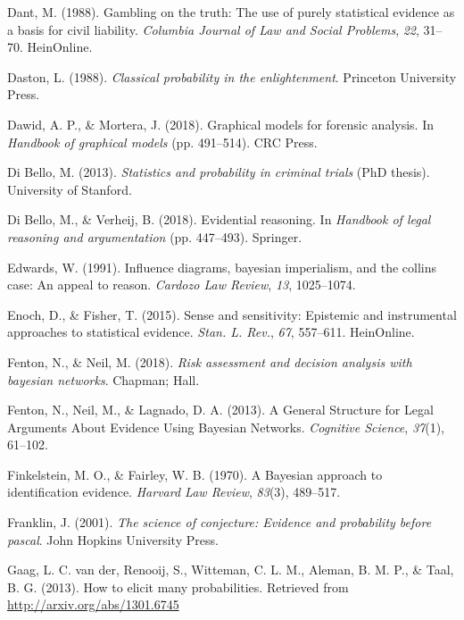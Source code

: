\documentclass[11pt,dvipsnames,enabledeprecatedfontcommands]{scrartcl}
\begin{document}
\leavevmode\hypertarget{ref-dant1988gambling}{}%
Dant, M. (1988). Gambling on the truth: The use of purely statistical
evidence as a basis for civil liability. \emph{Columbia Journal of Law
and Social Problems}, \emph{22}, 31--70. HeinOnline.

\leavevmode\hypertarget{ref-daston1988}{}%
Daston, L. (1988). \emph{Classical probability in the enlightenment}.
Princeton University Press.

\leavevmode\hypertarget{ref-dawid2018graphical}{}%
Dawid, A. P., \& Mortera, J. (2018). Graphical models for forensic
analysis. In \emph{Handbook of graphical models} (pp. 491--514). CRC
Press.

\leavevmode\hypertarget{ref-di2013statistics}{}%
Di Bello, M. (2013). \emph{Statistics and probability in criminal
trials} (PhD thesis). University of Stanford.

\leavevmode\hypertarget{ref-di2018evidential}{}%
Di Bello, M., \& Verheij, B. (2018). Evidential reasoning. In
\emph{Handbook of legal reasoning and argumentation} (pp. 447--493).
Springer.

\leavevmode\hypertarget{ref-Edwards1991Influence-diagr}{}%
Edwards, W. (1991). Influence diagrams, bayesian imperialism, and the
collins case: An appeal to reason. \emph{Cardozo Law Review}, \emph{13},
1025--1074.

\leavevmode\hypertarget{ref-enoch2015sense}{}%
Enoch, D., \& Fisher, T. (2015). Sense and sensitivity: Epistemic and
instrumental approaches to statistical evidence. \emph{Stan. L. Rev.},
\emph{67}, 557--611. HeinOnline.

\leavevmode\hypertarget{ref-Fenton2018Risk}{}%
Fenton, N., \& Neil, M. (2018). \emph{Risk assessment and decision
analysis with bayesian networks}. Chapman; Hall.

\leavevmode\hypertarget{ref-fenton2013GeneralStructureLegal}{}%
Fenton, N., Neil, M., \& Lagnado, D. A. (2013). A General Structure for
Legal Arguments About Evidence Using Bayesian Networks. \emph{Cognitive
Science}, \emph{37}(1), 61--102.

\leavevmode\hypertarget{ref-Finkelstein1970A}{}%
Finkelstein, M. O., \& Fairley, W. B. (1970). A Bayesian approach to
identification evidence. \emph{Harvard Law Review}, \emph{83}(3),
489--517.

\leavevmode\hypertarget{ref-Franklin2001}{}%
Franklin, J. (2001). \emph{The science of conjecture: Evidence and
probability before pascal}. John Hopkins University Press.

\leavevmode\hypertarget{ref-gaag2013elicit}{}%
Gaag, L. C. van der, Renooij, S., Witteman, C. L. M., Aleman, B. M. P.,
\& Taal, B. G. (2013). How to elicit many probabilities. Retrieved from
\url{http://arxiv.org/abs/1301.6745}
\end{document}
